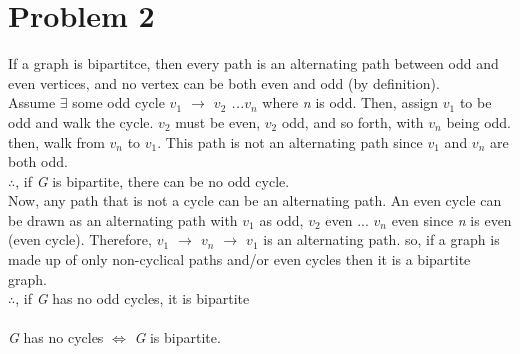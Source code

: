 \documentclass[]{article}
\begin{document}
\section*{Problem 2}
If a graph is bipartitce, then every path is an alternating path between odd and even vertices, and no vertex can be both even and odd (by definition). \\
Assume $\exists$ some odd cycle \textit{$v_1$ $\rightarrow$ $v_2$ ...$v_n$} where \textit{n} is odd. Then, assign \textit{$v_1$} to be odd and walk the cycle. \textit{$v_2$} must be even,  \textit{$v_2$} odd, and so forth, with \textit{$v_n$} being odd. then, walk from \textit{$v_n$} to \textit{$v_1$}. This path is not an alternating path since \textit{$v_1$} and \textit{$v_n$} are both odd. \\
$\therefore$, if \textit{G} is bipartite, there can be no odd cycle.\\
Now, any path that is not a cycle can be an alternating path. An even cycle can be drawn as an alternating path with \textit{$v_1$} as odd, \textit{$v_2$} even ... \textit{$v_n$} even since \textit{n} is even (even cycle). Therefore, \textit{$v_1$ $\rightarrow$ $v_n$ $\rightarrow$ $v_1$} is an alternating path. so, if a graph is made up of only non-cyclical paths and/or even cycles then it is a bipartite graph. \\
$\therefore$, if \textit{G} has no odd cycles, it is bipartite\\
\\
\textit{G} has no cycles $\Leftrightarrow$ \textit{G} is bipartite.
\end{document}
